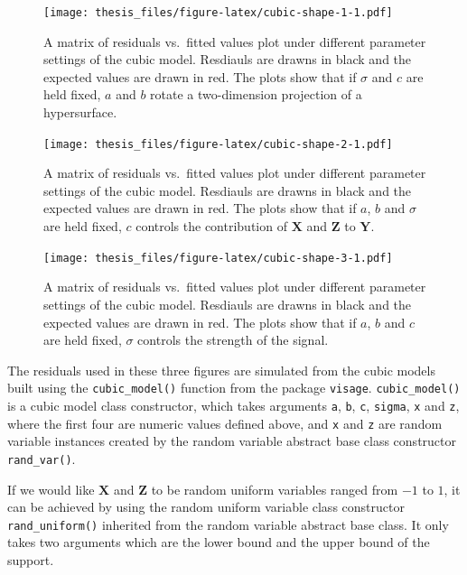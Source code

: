 \documentclass{monashthesis}
\theoremstyle{definition}
\theoremstyle{definition}
\theoremstyle{definition}
\theoremstyle{definition}
\theoremstyle{remark}
\begin{document}
\begin{figure}
\centering
\texttt{[image: thesis\_files/figure-latex/cubic-shape-1-1.pdf]}
\caption{\label{fig:cubic-shape-1}A matrix of residuals vs.~fitted values plot under different parameter settings of the cubic model. Resdiauls are drawns in black and the expected values are drawn in red. The plots show that if \(\sigma\) and \(c\) are held fixed, \(a\) and \(b\) rotate a two-dimension projection of a hypersurface.}
\end{figure}

\begin{figure}
\centering
\texttt{[image: thesis\_files/figure-latex/cubic-shape-2-1.pdf]}
\caption{\label{fig:cubic-shape-2}A matrix of residuals vs.~fitted values plot under different parameter settings of the cubic model. Resdiauls are drawns in black and the expected values are drawn in red. The plots show that if \(a\), \(b\) and \(\sigma\) are held fixed, \(c\) controls the contribution of \(\boldsymbol{X}\) and \(\boldsymbol{Z}\) to \(\boldsymbol{Y}\).}
\end{figure}

\begin{figure}
\centering
\texttt{[image: thesis\_files/figure-latex/cubic-shape-3-1.pdf]}
\caption{\label{fig:cubic-shape-3}A matrix of residuals vs.~fitted values plot under different parameter settings of the cubic model. Resdiauls are drawns in black and the expected values are drawn in red. The plots show that if \(a\), \(b\) and \(c\) are held fixed, \(\sigma\) controls the strength of the signal.}
\end{figure}

The residuals used in these three figures are simulated from the cubic models built using the \texttt{cubic\_model()} function from the package \texttt{visage}. \texttt{cubic\_model()} is a cubic model class constructor, which takes arguments \texttt{a}, \texttt{b}, \texttt{c}, \texttt{sigma}, \texttt{x} and \texttt{z}, where the first four are numeric values defined above, and \texttt{x} and \texttt{z} are random variable instances created by the random variable abstract base class constructor \texttt{rand\_var()}.

If we would like \(\boldsymbol{X}\) and \(\boldsymbol{Z}\) to be random uniform variables ranged from \(-1\) to \(1\), it can be achieved by using the random uniform variable class constructor \texttt{rand\_uniform()} inherited from the random variable abstract base class. It only takes two arguments which are the lower bound and the upper bound of the support.
\end{document}
